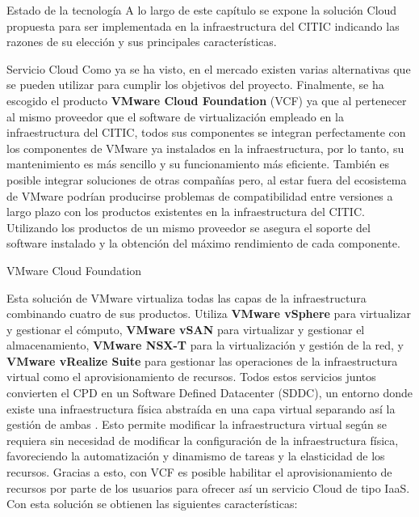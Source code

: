 \begin{chapter}{Estado de la tecnología}
    A lo largo de este capítulo se expone la solución Cloud propuesta para ser implementada en la infraestructura del CITIC indicando las razones de su elección y sus principales características.

\begin{section}{Servicio Cloud}    
    Como ya se ha visto, en el mercado existen varias alternativas que se pueden utilizar para cumplir los objetivos del proyecto. Finalmente, se ha escogido el producto \textbf{VMware Cloud Foundation} (VCF) ya que al pertenecer al mismo proveedor que el software de virtualización empleado en la infraestructura del CITIC, todos sus componentes se integran perfectamente con los componentes de VMware ya instalados en la infraestructura, por lo tanto, su mantenimiento es más sencillo y su funcionamiento más eficiente. También es posible integrar soluciones de otras compañías pero, al estar fuera del ecosistema de VMware podrían producirse problemas de compatibilidad entre versiones a largo plazo con los productos existentes en la infraestructura del CITIC. Utilizando los productos de un mismo proveedor se asegura el soporte del software instalado y la obtención del máximo rendimiento de cada componente.        
    \begin{subsection}{VMware Cloud Foundation}
    
        Esta solución de VMware virtualiza todas las capas de la infraestructura combinando cuatro de sus productos. Utiliza \textbf{VMware vSphere} para virtualizar y gestionar el cómputo, \textbf{VMware vSAN} para virtualizar y gestionar el almacenamiento, \textbf{VMware NSX-T} para la virtualización y gestión de la red, y \textbf{VMware vRealize Suite} para gestionar las operaciones de la infraestructura virtual como el aprovisionamiento de recursos. Todos estos servicios juntos convierten el CPD en un Software Defined Datacenter (SDDC), un entorno donde existe una infraestructura física abstraída en una capa virtual separando así la gestión de ambas \cite{sddc-definition}. Esto permite modificar la infraestructura virtual según se requiera sin necesidad de modificar la configuración de la infraestructura física, favoreciendo la automatización y dinamismo de tareas y la elasticidad de los recursos. Gracias a esto, con VCF es posible habilitar el aprovisionamiento de recursos por parte de los usuarios para ofrecer así un servicio Cloud de tipo IaaS. Con esta solución se obtienen las siguientes características:
        

\end{subsection}
\end{section}
\end{chapter}
